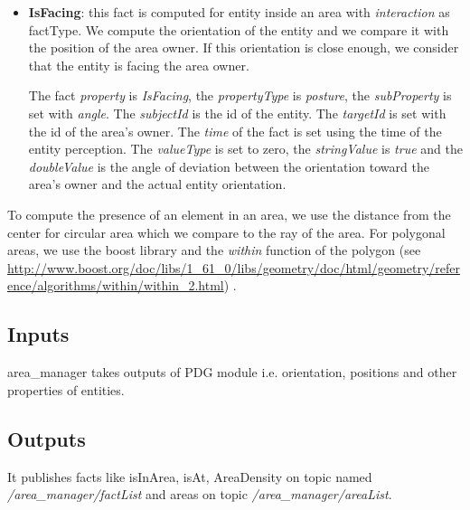 \documentclass[a4paper]{article}
\begin{document}
\begin{itemize}
\item \textbf{IsFacing}: this fact is computed for entity inside an area with \textit{interaction} as factType. We compute the orientation of the entity and we compare it with the position of the area owner. If this orientation is close enough, we consider that the entity is facing the area owner. 

The fact \textit{property} is \textit{IsFacing}, the \textit{propertyType} is \textit{posture}, the \textit{subProperty} is set with \textit{angle}. The \textit{subjectId} is the id of the entity. The \textit{targetId} is set with the id of the area's owner. The \textit{time} of the fact is set using the time of the entity perception. The \textit{valueType} is set to zero, the \textit{stringValue} is \textit{true} and the \textit{doubleValue} is the angle of deviation between the orientation toward the area's owner and the actual entity orientation.

\end{itemize}

To compute the presence of an element in an area, we use the distance from the center for circular area which we compare to the ray of the area.
For polygonal areas, we use the boost library and the \textit{within} function of the polygon (see \url{http://www.boost.org/doc/libs/1_61_0/libs/geometry/doc/html/geometry/reference/algorithms/within/within_2.html}) .


\subsection{Inputs}
area\_manager takes outputs of PDG module i.e. orientation, positions and other properties of entities. 
\subsection{Outputs}
It publishes facts like isInArea, isAt, AreaDensity on topic named \textit{/area\_manager/factList} and areas on topic \textit{/area\_manager/areaList}.
\end{document}
